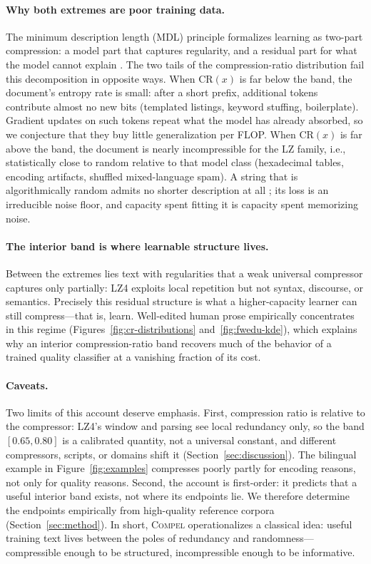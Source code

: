 \paragraph{Why both extremes are poor training data.}
The minimum description length (MDL) principle formalizes learning as two-part compression: a model part that captures regularity, and a residual part for what the model cannot explain \citep{rissanen1978modeling, grunwald2007minimum}.
The two tails of the compression-ratio distribution fail this decomposition in opposite ways.
When $\mathrm{CR}(x)$ is far below the band, the document's entropy rate is small: after a short prefix, additional tokens contribute almost no new bits (templated listings, keyword stuffing, boilerplate).
Gradient updates on such tokens repeat what the model has already absorbed, so we conjecture that they buy little generalization per FLOP.
When $\mathrm{CR}(x)$ is far above the band, the document is nearly incompressible for the LZ family, i.e., statistically close to random relative to that model class (hexadecimal tables, encoding artifacts, shuffled mixed-language spam).
A string that is algorithmically random admits no shorter description at all \citep{li2008introduction}; its loss is an irreducible noise floor, and capacity spent fitting it is capacity spent memorizing noise.

\paragraph{The interior band is where learnable structure lives.}
Between the extremes lies text with regularities that a weak universal compressor captures only partially: LZ4 exploits local repetition but not syntax, discourse, or semantics.
Precisely this residual structure is what a higher-capacity learner can still compress---that is, learn.
Well-edited human prose empirically concentrates in this regime (Figures~\ref{fig:cr-distributions} and~\ref{fig:fwedu-kde}), which explains why an interior compression-ratio band recovers much of the behavior of a trained quality classifier at a vanishing fraction of its cost.

\paragraph{Caveats.}
Two limits of this account deserve emphasis.
First, compression ratio is relative to the compressor: LZ4's window and parsing see local redundancy only, so the band $[0.65, 0.80]$ is a calibrated quantity, not a universal constant, and different compressors, scripts, or domains shift it (Section~\ref{sec:discussion}).
The bilingual example in Figure~\ref{fig:examples} compresses poorly partly for encoding reasons, not only for quality reasons.
Second, the account is first-order: it predicts that a useful interior band exists, not where its endpoints lie.
We therefore determine the endpoints empirically from high-quality reference corpora (Section~\ref{sec:method}).
In short, \textsc{Compel} operationalizes a classical idea: useful training text lives between the poles of redundancy and randomness---compressible enough to be structured, incompressible enough to be informative.
